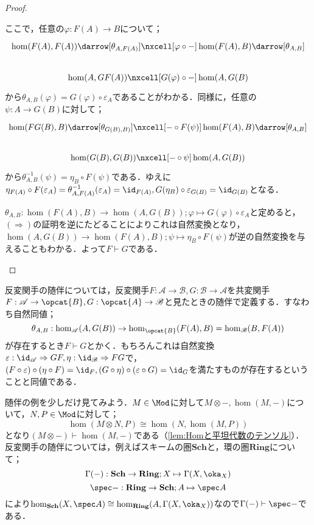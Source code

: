 \begin{proof}
\begin{eqv}
		ここで，任意の$\varphi:F(A)\to B$について；
		\[\begin{tikzcd}
			\hom(F(A),F(A))\darrow[\theta_{A,F(A)}]\nxcell[\varphi\circ-]\hom(F(A),B)\darrow[\theta_{A,B}]\\
			\hom(A,GF(A))\nxcell[G(\varphi)\circ -]\hom(A,G(B)
		\end{tikzcd}\]
		から$\theta_{A,B}(\varphi)=G(\varphi)\circ\varepsilon_A$であることがわかる．同様に，任意の$\psi:A\to G(B)$に対して；
		\[\begin{tikzcd}
			\hom(FG(B),B)\darrow[\theta_{G(B),B)}]\nxcell[-\circ F(\psi)]\hom(F(A),B)\darrow[\theta_{A,B}]\\
			\hom(G(B),G(B))\nxcell[-\circ\psi]\hom(A,G(B))
		\end{tikzcd}\]
		から$\theta_{A,B}^{-1}(\psi)=\eta_B\circ F(\psi)$である．ゆえに$\eta_{F(A)}\circ F(\varepsilon_A)=\theta_{A,F(A)}^{-1}(\varepsilon_A)=\id_{F(A)}, G(\eta_B)\circ\varepsilon_{G(B)}=\id_{G(B)}$となる．
		\item $\theta_{A,B}:\hom(F(A),B)\to\hom(A,G(B));\varphi\mapsto G(\varphi)\circ\varepsilon_A$と定めると，$(\Longrightarrow)$の証明を逆にたどることによりこれは自然変換となり，$\hom(A,G(B))\to\hom(F(A),B);\psi\mapsto\eta_B\circ F(\psi)$が逆の自然変換を与えることもわかる．よって$F\vdash G$である．
	\end{eqv}
\end{proof}

反変関手の随伴については，反変関手$F:\mathscr{A}\to\mathscr{B},G:\mathscr{B}\to\mathscr{A}$を共変関手$F:\mathscr{A}\to\opcat{B},G:\opcat{A}\to\mathscr{B}$と見たときの随伴で定義する．すなわち自然同値；
\[\theta_{A,B}:\hom_{\mathscr{A}}(A,G(B))\to\hom_{\opcat{B}}(F(A),B)=\hom_{\mathscr{B}}(B,F(A))\]
が存在するとき$F\vdash G$とかく．もちろんこれは自然変換$\varepsilon:\id_{\mathscr{A}}\Rightarrow GF, \eta:\id_{\mathscr{B}}\Rightarrow FG$で，$(F\circ\varepsilon)\circ(\eta\circ F)=\id_F, (G\circ\eta)\circ(\varepsilon\circ G)=\id_G$を満たすものが存在するということと同値である．

随伴の例を少しだけ見てみよう．$M\in\Mod$に対して$M\otimes -, \hom(M,-)$について，$N,P\in\Mod$に対して；
\[\hom(M\otimes N,P)\cong\hom(N,\hom(M,P))\]
となり$(M\otimes -)\vdash\hom(M,-)$である（\ref{lem:Homと平坦代数のテンソル}）．反変関手の随伴については，例えばスキームの圏$\mathbf{Sch}$と，環の圏$\mathbf{Ring}$について；
\[\Gamma(-):\mathbf{Sch}\to\mathbf{Ring};X\mapsto \Gamma(X,\oka_X)\]
\[\spec -:\mathbf{Ring}\to\mathbf{Sch};A\mapsto\spec A\]
により$\hom_{\mathbf{Sch}}(X,\spec A)\cong\hom_{\mathbf{Ring}}(A,\Gamma(X,\oka_X))$なので$\Gamma(-)\vdash\spec -$である．


